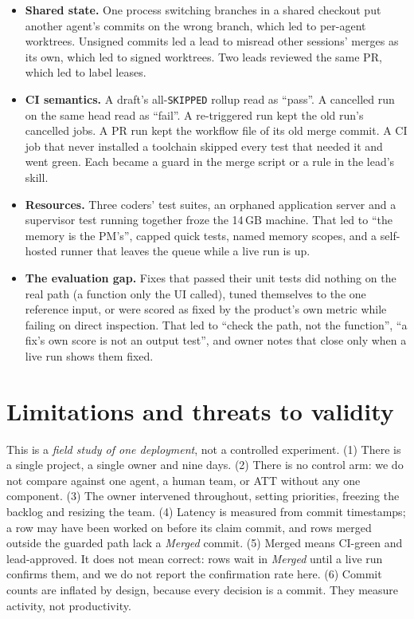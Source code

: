 \documentclass[11pt]{article}
\begin{document}
\begin{itemize}[leftmargin=*,itemsep=2pt]
\item \textbf{Shared state.} One process switching branches in a shared
  checkout put another agent's commits on the wrong branch, which led to
  per-agent worktrees. Unsigned commits led a lead to misread other sessions'
  merges as its own, which led to signed worktrees. Two leads reviewed the same
  PR, which led to label leases.
\item \textbf{CI semantics.} A draft's all-\texttt{SKIPPED} rollup read as
  ``pass''. A cancelled run on the same head read as ``fail''. A re-triggered
  run kept the old run's cancelled jobs. A PR run kept the workflow file of its
  old merge commit. A CI job that never installed a toolchain skipped every
  test that needed it and went green. Each became a guard in the merge script
  or a rule in the lead's skill.
\item \textbf{Resources.} Three coders' test suites, an orphaned application
  server and a supervisor test running together froze the 14\,GB machine. That
  led to ``the memory is the PM's'', capped quick tests, named memory scopes,
  and a self-hosted runner that leaves the queue while a live run is up.
\item \textbf{The evaluation gap.} Fixes that passed their unit tests did
  nothing on the real path (a function only the UI called), tuned themselves to
  the one reference input, or were scored as fixed by the product's own metric
  while failing on direct inspection. That led to ``check the path, not the
  function'', ``a fix's own score is not an output test'', and owner notes that
  close only when a live run shows them fixed.
\end{itemize}

\section{Limitations and threats to validity}\label{sec:limits}
This is a \emph{field study of one deployment}, not a controlled experiment.
(1) There is a single project, a single owner and nine days. (2) There is no
control arm: we do not compare against one agent, a human team, or ATT without
any one component. (3) The owner intervened throughout, setting priorities,
freezing the backlog and resizing the team. (4) Latency is measured from commit
timestamps; a row may have been worked on before its claim commit, and rows
merged outside the guarded path lack a \emph{Merged} commit. (5) Merged means
CI-green and lead-approved. It does not mean correct: rows wait in
\emph{Merged} until a live run confirms them, and we do not report the
confirmation rate here. (6) Commit counts are inflated by design, because every
decision is a commit. They measure activity, not productivity.
\end{document}
